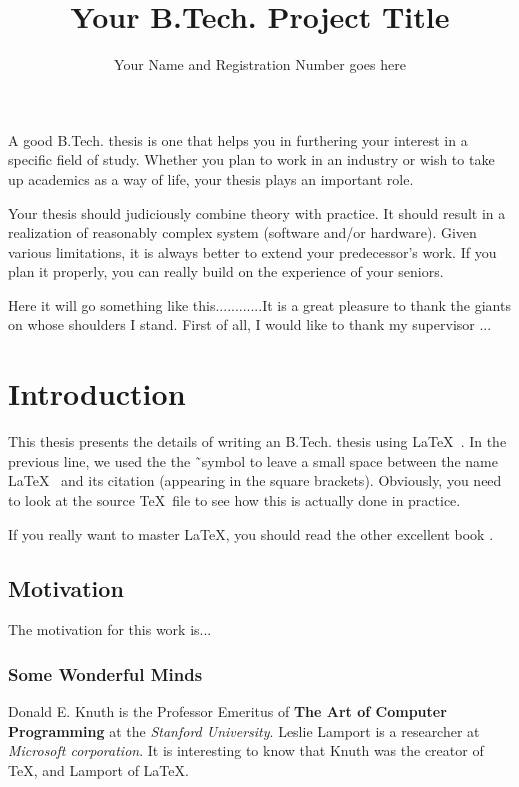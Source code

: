\documentclass{mnnit}
\begin{document}
\title{Your B.Tech. Project Title}
\author{Your Name and Registration Number goes here}

\beforepreface
{}
A good B.Tech. thesis is one that helps you in furthering your
interest in a specific field of study. Whether you plan to work in
an industry or wish to take up academics as a way of life, your
thesis plays an important role.

Your thesis should judiciously combine theory with practice. It
should result in a realization of reasonably complex system
(software and/or hardware). Given various limitations, it is
always better to extend your predecessor's work. If you plan it
properly, you can really build on the experience of your seniors.

    Here it will go something like this............It is a great pleasure to thank the giants on whose shoulders I
    stand. First of all, I would like to thank my supervisor ...
\afterpreface

\chapter{Introduction}
This thesis presents the details of writing an B.Tech. thesis
using \LaTeX ~\cite{lamport}. In the previous line, we used the
the \~ \ symbol to leave a small space between the name \LaTeX
~and its citation (appearing in the square brackets). Obviously,
you need to look at the source \TeX ~file to see how this is
actually done in practice.

If you really want to master \LaTeX, you should read the other
excellent book \cite{companion}.

\section{Motivation}
The motivation for this work is...

\subsection{Some Wonderful Minds}
 Donald E. Knuth is the Professor Emeritus of \textbf{The Art of Computer
 Programming} at the \emph{Stanford University}. Leslie Lamport is
 a researcher at \emph{Microsoft corporation}. It is interesting to know
 that Knuth was the creator of \TeX, and Lamport of \LaTeX.
\end{document}
